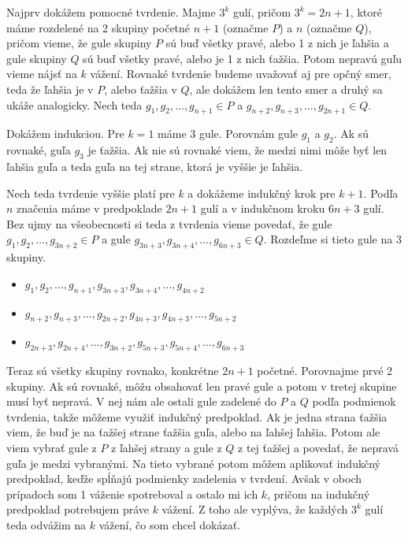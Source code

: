 
Najprv dokážem pomocné tvrdenie. Majme $3^k$ gulí, pričom $3^k=2n+1$, 
ktoré máme rozdelené na 2 skupiny početné $n+1$ (označme $P$) a $n$ 
(označme $Q$), pričom vieme, že gule skupiny $P$ sú buď všetky pravé, 
alebo 1 z nich je ľahšia a gule skupiny $Q$ sú buď všetky pravé, alebo 
je 1 z nich ťažšia. Potom nepravú guľu vieme nájsť na $k$ vážení. 
Rovnaké tvrdenie budeme uvažovať aj pre opčný smer, teda že ľahšia je 
v $P$, alebo ťažšia v $Q$, ale dokážem len tento smer a druhý sa ukáže 
analogicky. Nech teda $g_1, g_2,\dots, g_{n+1}\in P$ a 
$g_{n+2}, g_{n+3},\dots, g_{2n+1}\in Q$.

Dokážem indukciou. Pre $k=1$ máme 3 gule. Porovnám gule $g_1$ a $g_2$. 
Ak sú rovnaké, guľa $g_3$ je ťažšia. Ak nie sú rovnaké viem, že medzi 
nimi môže byť len ľahšia guľa a teda guľa na tej strane, ktorá je 
vyššie je ľahšia. 

Nech teda tvrdenie vyššie platí pre $k$ a dokážeme indukčný krok pre 
$k+1$. Podľa $n$ značenia máme v predpoklade $2n+1$ gulí a v indukčnom 
kroku $6n+3$ gulí. Bez ujmy na všeobecnosti si teda z tvrdenia vieme 
povedať, že gule $g_1, g_2,\dots, g_{3n+2}\in P$ a gule 
$g_{3n+3}, g_{3n+4},\dots, g_{6n+3}\in Q$. Rozdeľme si tieto gule na 
3 skupiny. 
\begin{itemize}
    \item $g_1, g_2,\dots, g_{n+1}, 
    g_{3n+3}, g_{3n+4},\dots, g_{4n+2}$
    \item $g_{n+2}, g_{n+3},\dots, g_{2n+2}, 
    g_{4n+3}, g_{4n+3},\dots, g_{5n+2}$
    \item $g_{2n+3}, g_{2n+4},\dots, g_{3n+2}, 
    g_{5n+3}, g_{5n+4},\dots, g_{6n+3}$
\end{itemize}
Teraz sú všetky skupiny rovnako, konkrétne $2n+1$ početné. Porovnajme 
prvé 2 skupiny. Ak sú rovnaké, môžu obsahovať len pravé gule a potom 
v tretej skupine musí byť nepravá. V nej nám ale ostali gule zadelené 
do $P$ a $Q$ podľa podmienok tvrdenia, takže môžeme využiť indukčný 
predpoklad. Ak je jedna strana ťažšia viem, že buď je na ťažšej strane 
ťažšia guľa, alebo na ľahšej ľahšia. Potom ale viem vybrať gule z $P$ 
z ľahšej strany a gule z $Q$ z tej ťažšej a povedať, že nepravá guľa 
je medzi vybranými. Na tieto vybrané potom môžem aplikovať indukčný 
predpoklad, keďže spĺňajú podmienky zadelenia v tvrdení. Avšak v oboch 
prípadoch som 1 váženie spotreboval a ostalo mi ich $k$, pričom na 
indukčný predpoklad potrebujem práve $k$ vážení. Z toho ale vyplýva, že
každých $3^k$ gulí teda odvážim na $k$ vážení, čo som chcel dokázať.

